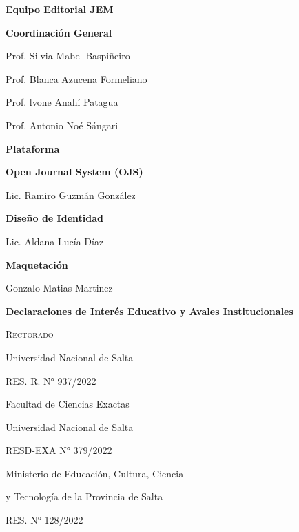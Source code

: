 \begin{center}
	\LARGE \bfseries \sffamily Equipo Editorial JEM
\end{center}

\begin{center}
	\sffamily \Large \bfseries Coordinación General
	
	\bigskip
	
	\normalfont \large
	Prof. Silvia Mabel Baspiñeiro
	
	Prof. Blanca Azucena Formeliano
	
	Prof. lvone Anahí Patagua
	
	Prof. Antonio Noé Sángari
\end{center}

\vspace*{2.5mm}

\begin{center}
	\sffamily \Large \bfseries Plataforma
	
	\bigskip
	
	\sffamily \large \bfseries Open Journal System (OJS)
	
	\normalfont \large
	Lic. Ramiro Guzmán González
	
	\bigskip
	
	\sffamily \large \bfseries Diseño de Identidad
	
	\normalfont \large
	Lic. Aldana Lucía Díaz
	
	\bigskip
	
	\sffamily \large \bfseries Maquetación 
	
	\normalfont \large
	Gonzalo Matias Martinez
\end{center}

\vspace*{5mm}

\begin{center}
	\sffamily \Large \bfseries Declaraciones de Interés Educativo y Avales Institucionales
	
	\bigskip
	
	\normalfont \normalsize \scshape
	Rectorado
	
	Universidad Nacional de Salta
	
	RES. R. N° 937/2022
	
	\bigskip
	
	Facultad de Ciencias Exactas 
	
	Universidad Nacional de Salta
	
	RESD-EXA N° 379/2022
	
	\bigskip
	
	Ministerio de Educación, Cultura, Ciencia 
	
	y Tecnología de la Provincia de Salta
	
	RES. N° 128/2022
	
\end{center}